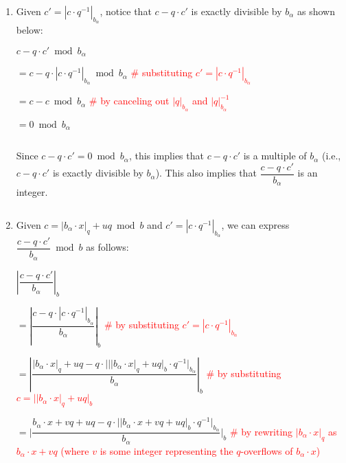 \begin{myproof}

\begin{enumerate}
\item Given $c' = |c \cdot q^{-1}|_{b_\alpha}$, notice that $c - q \cdot c'$ is exactly divisible by $b_\alpha$ as shown below: 

$c - q \cdot c' \bmod b_\alpha$

$= c - q \cdot |c \cdot q^{-1}|_{b_\alpha} \bmod b_\alpha$ \textcolor{red}{ \# substituting $c' = |c \cdot q^{-1}|_{b_\alpha}$}

$= c - c \bmod b_\alpha$ \textcolor{red}{ \# by canceling out $|q|_{b_\alpha}$ and $|q|^{-1}_{b_\alpha}$}

$= 0 \bmod b_\alpha$

$ $

Since $c - q \cdot c' = 0 \bmod b_\alpha$, this implies that $c - q \cdot c'$ is a multiple of $b_\alpha$ (i.e., $c - q \cdot c'$ is exactly divisible by $b_\alpha$). This also implies that $\dfrac{c - q \cdot c'}{b_\alpha}$ is an integer. 

$ $

\item Given $c = |b_\alpha \cdot x|_q + uq \bmod b$ and $c' = |c \cdot q^{-1}|_{b_\alpha}$, we can express $\dfrac{c - q \cdot c'}{b_\alpha} \bmod b$ as follows:

$\left|\dfrac{c - q \cdot c'}{b_\alpha}\right|_{b}$


$ = \left|\dfrac{c - q \cdot |c \cdot q^{-1}|_{b_\alpha}}{b_\alpha}\right|_{b}$ \textcolor{red}{ \# by substituting $c' = |c \cdot q^{-1}|_{b_\alpha}$}


$ = \left|\dfrac{|b_\alpha \cdot x|_q + uq - q \cdot \Bigg|\Big||b_\alpha \cdot x|_q + uq\Big|_{b} \cdot q^{-1}\Bigg|_{b_\alpha}}{b_\alpha}\right|_{b}$ \textcolor{red}{ \# by substituting $c = \Big||b_\alpha \cdot x|_q + uq\Big|_{b}$}


$ = \Bigg|\dfrac{b_\alpha\cdot x + vq + uq - q \cdot \Big||b_\alpha\cdot x + vq + uq|_{b} \cdot q^{-1}\Big|_{b_\alpha}}{b_\alpha}\Bigg|_{b}$ \textcolor{red}{ \# by rewriting $|b_\alpha\cdot x|_{q}$ as $b_\alpha\cdot x + vq$ (where $v$ is some integer representing the $q$-overflows of $b_\alpha\cdot x$)}

$ $


\end{enumerate}
\end{myproof}
